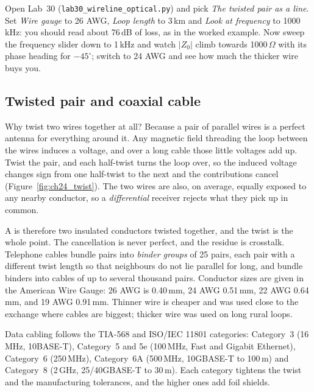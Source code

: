\begin{tryit}
Open Lab~30 (\texttt{lab30\_wireline\_optical.py}) and pick \emph{The twisted pair as a line}.
Set \emph{Wire gauge} to 26 AWG, \emph{Loop length} to 3\,km and \emph{Look at frequency} to
1000\,kHz: you should read about 76\,dB of loss, as in the worked example. Now sweep the
frequency slider down to 1\,kHz and watch $|Z_0|$ climb towards 1000\,$\Omega$ with its phase
heading for $-45^\circ$; switch to 24 AWG and see how much the thicker wire buys you.
\end{tryit}

\subsection{Twisted pair and coaxial cable}

Why twist two wires together at all? Because a pair of parallel wires is a perfect antenna for
everything around it. Any magnetic field threading the loop between the wires induces a voltage,
and over a long cable those little voltages add up. Twist the pair, and each half-twist turns the
loop over, so the induced voltage changes sign from one half-twist to the next and the
contributions cancel (Figure~\ref{fig:ch24_twist}). The two wires are also, on average, equally
exposed to any nearby conductor, so a \emph{differential} receiver rejects what they pick up in
common.

A  is therefore two insulated conductors twisted together, and the twist is the
whole point. The cancellation is never perfect, and the residue is crosstalk. Telephone cables
bundle pairs into \emph{binder groups} of 25 pairs, each pair with a different twist length so
that neighbours do not lie parallel for long, and bundle binders into cables of up to several
thousand pairs. Conductor sizes are given in the American Wire Gauge: 26 AWG is 0.40\,mm, 24 AWG
0.51\,mm, 22 AWG 0.64\,mm, and 19 AWG 0.91\,mm. Thinner wire is cheaper and was used close to the
exchange where cables are biggest; thicker wire was used on long rural loops.



Data cabling follows the TIA-568 and ISO/IEC 11801 categories: Category~3 (16\,MHz, 10BASE-T),
Category~5 and 5e (100\,MHz, Fast and Gigabit Ethernet), Category~6 (250\,MHz), Category~6A
(500\,MHz, 10GBASE-T to 100\,m) and Category~8 (2\,GHz, 25/40GBASE-T to 30\,m). Each category
tightens the twist and the manufacturing tolerances, and the higher ones add foil shields.

